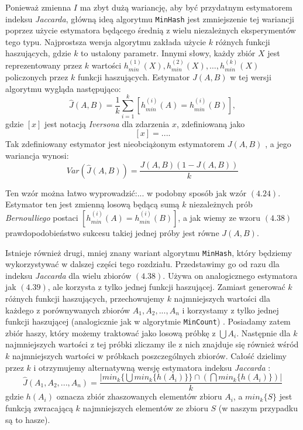 Ponieważ zmienna $I$ ma zbyt dużą wariancję, aby być przydatnym estymatorem indeksu \textit{Jaccarda}, główną ideą algorytmu \texttt{MinHash} jest zmniejszenie tej wariancji poprzez użycie estymatora będącego średnią z wielu niezależnych eksperymentów tego typu. Najprostsza wersja algorytmu zakłada użycie $k$ różnych funkcji haszujących, gdzie $k$ to ustalony parametr. Innymi słowy, każdy zbiór $X$ jest reprezentowany przez $k$ wartości $h^{(1)}_{min}(X), h^{(2)}_{min}(X), \ldots, h^{(k)}_{min}(X)$ policzonych przez $k$ funkcji haszujących.
Estymator $J(A, B)$ w tej wersji algorytmu wygląda następująco:
\begin{equation}
    \hat{J}(A, B) = \frac{1}{k}\sum_{i=1}^{k}[h_{min}^{(i)}(A) = h_{min}^{(i)}(B)],
\end{equation}
gdzie $[x]$ jest notacją \textit{Iversona} dla zdarzenia $x$, zdefiniowaną jako 
$$[x] = ... .$$ 
Tak zdefiniowany estymator jest nieobciążonym estymatorem $J(A, B)$ \cite{minhash}, a jego wariancja wynosi:
\begin{equation}
    Var(\hat{J}(A,B)) = \frac{J(A, B)(1 - J(A, B))}{k}
\end{equation}

Ten wzór można łatwo wyprowadzić:...
 w podobny sposób jak wzór $(4.24)$.  Estymator ten jest zmienną losową będącą sumą $k$ niezależnych prób \textit{Bernoulliego} postaci $[h_{min}^{(i)}(A) = h_{min}^{(i)}(B)]$, a jak wiemy ze wzoru $(4.38)$ prawdopodobieństwo sukcesu takiej jednej próby jest równe $J(A, B)$.

Istnieje również drugi, mniej znany wariant algorytmu \texttt{MinHash}, który będziemy wykorzystywać w dalszej części tego rozdziału. Przedstawimy go od razu dla indeksu \textit{Jaccarda} dla wielu zbiorów $(4.38)$.
 Używa on analogicznego estymatora jak $(4.39)$, ale korzysta z tylko jednej funkcji haszującej. Zamiast generować $k$ różnych funkcji haszujących, przechowujemy $k$ najmniejszych wartości dla każdego z porównywanych zbiorów $A_1, A_2, ..., A_n$ i korzystamy z tylko jednej funkcji haszującej (analogicznie jak w algorytmie \texttt{MinCount}) \cite{adroll}. Posiadamy zatem zbiór haszy, który możemy traktować jako losową próbkę z $\bigcup A_i$. Następnie dla $k$ najmniejszych wartości z tej próbki zliczamy ile z nich znajduje się również wśród $k$ najmniejszych wartości w próbkach poszczególnych zbiorów. Całość dzielimy przez $k$ i otrzymujemy alternatywną wersję estymatora indeksu \textit{Jaccarda} \cite{adroll}:
\begin{equation}
    \hat{J}(A_1, A_2, ..., A_n) = \frac{|min_{k}\{\bigcup min_{k} \{ h(A_i) \} \} \cap (\bigcap min_{k}\{h(A_i)\})|}{k}
\end{equation}
gdzie $h(A_i)$ oznacza zbiór zhaszowanych elementów zbioru $A_i$, a $min_{k}\{S\}$ jest funkcją zwracającą $k$ najmniejszych elementów ze zbioru $S$ (w naszym przypadku są to hasze).



